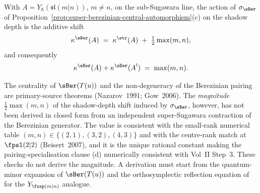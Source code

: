 \begin{conjecture}
\label{conj:super-berezinian-shadow-shift-magnitude}
\ClaimStatusConjectured
With $A = Y_\hbar(\mathfrak{sl}(m|n))$, $m\neq n$, on the
sub-Sugawara line, the action of $\sigma_{\sBer}$ of
Proposition~\ref{prop:super-berezinian-central-automorphism}(c) on
the shadow depth is the additive shift
\[
 \kappa^{\sBer}(A) \;=\; \kappa^{\str}(A) \;+\;
 \tfrac{1}{2}\max(m, n),
\]
and consequently
\[
 \kappa^{\sBer}(A) + \kappa^{\sBer}(A^{!}) \;=\; \max(m, n).
\]
\end{conjecture}

\begin{remark}
\label{rem:super-berezinian-shift-open}
The centrality of $\sBer(T(u))$ and the non-degeneracy of the
Berezinian pairing are primary-source theorems
(Nazarov~1991; Gow~2006). The \emph{magnitude}
$\tfrac{1}{2}\max(m,n)$ of the shadow-depth shift induced by
$\sigma_{\sBer}$, however, has not been derived in closed form from
an independent super-Sugawara contraction of the Berezinian
generator. The value is consistent with the small-rank numerical
table $(m,n) \in \{(2,1), (3,2), (4,3)\}$ and with the centre-rank
match at $\fpsl(2|2)$ (Beisert~2007), and it is the unique rational
constant making the pairing-specialisation clause (d) numerically
consistent with Vol~II Step~3. These checks do not derive the
magnitude. A derivation must start from the quantum-minor expansion of
$\sBer(T(u))$ and the orthosymplectic reflection equation of
\cite{AcdfR2003} for the $Y_{\fosp(m|n)}$ analogue.
\end{remark}

